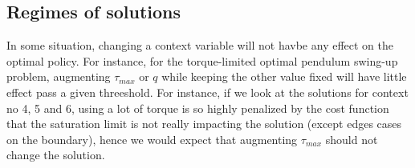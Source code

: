 \subsection{Regimes of solutions}

In some situation, changing a context variable will not havbe any effect on the optimal policy. For instance, for the torque-limited optimal pendulum swing-up problem, augmenting $\tau_{max}$ or $q$ while keeping the other value fixed will have little effect pass a given threeshold. For instance, if we look at the solutions for context no 4, 5 and 6, using a lot of torque is so highly penalized by the cost function that the saturation limit is not really impacting the solution (except edges cases on the boundary), hence we would expect that augmenting $\tau_{max}$ should not change the solution. 

